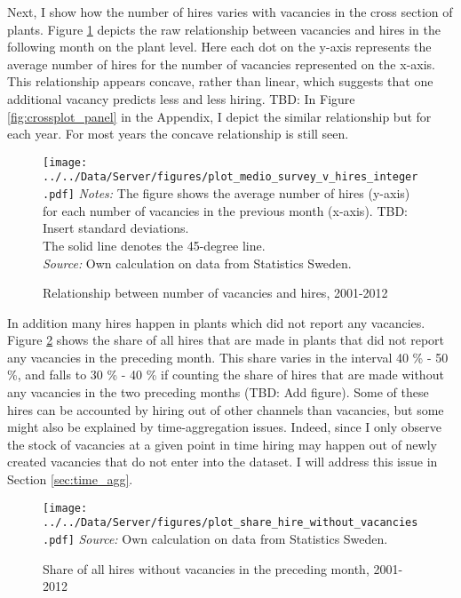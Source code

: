 Next, I show how the number of hires varies with vacancies in the cross section of plants. Figure \ref{fig:crossplot} depicts the raw relationship between vacancies and hires in the following month on the plant level. Here each dot on the y-axis represents the average number of hires for the number of vacancies represented on the x-axis. This relationship appears concave, rather than linear,  which suggests that one additional vacancy predicts less and less hiring. TBD: In Figure \ref{fig:crossplot_panel} in the Appendix, I depict the similar relationship but for each year. For most years the concave relationship is still seen. 

\begin{figure}[t]
\centering
\caption{Relationship between number of vacancies and hires, 2001-2012}
\texttt{[image: ../../Data/Server/figures/plot\_medio\_survey\_v\_hires\_integer.pdf]}
\flushleft
\footnotesize{\emph{Notes:} The figure shows the average number of hires (y-axis) for each number of vacancies in the previous month (x-axis). TBD: Insert standard deviations.} \\
\footnotesize{The solid line denotes the 45-degree line.} \\
\footnotesize{\emph{Source:} Own calculation on data from Statistics Sweden.}
\label{fig:crossplot}
\end{figure}

In addition many hires happen in plants which did not report any vacancies. Figure \ref{fig:share_without} shows the share of all hires that are made in plants that did not report any vacancies in the preceding month. This share varies in the interval 40 \% - 50 \%, and falls to 30 \% - 40 \% if counting the share of hires that are made without any vacancies in the two preceding months (TBD: Add figure). Some of these hires can be accounted by hiring out of other channels than vacancies, but some might also be explained by time-aggregation issues. Indeed, since I only observe the stock of vacancies at a given point in time hiring may happen out of newly created vacancies that do not enter into the dataset. I will address this issue in Section \ref{sec:time_agg}.

\begin{figure}[t]
\centering
\caption{Share of all hires without vacancies in the preceding month, 2001-2012}
\texttt{[image: ../../Data/Server/figures/plot\_share\_hire\_without\_vacancies.pdf]}
\flushleft
\footnotesize{\emph{Source:} Own calculation on data from Statistics Sweden.}
\label{fig:share_without}
\end{figure}

